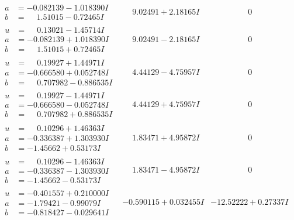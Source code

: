 \documentclass[1p]{elsarticle_modified}
\theoremstyle{definition}
\begin{document}
$$\begin{array}{c|c|c}
\begin{aligned}
a &= -0.082139 - 1.018390 I \\
b &= \phantom{-}1.51015 - 0.72465 I\end{aligned}
 & \phantom{-}9.02491 + 2.18165 I & \phantom{-0.000000 } 0 \\ \hline\begin{aligned}
u &= \phantom{-}0.13021 - 1.45714 I \\
a &= -0.082139 + 1.018390 I \\
b &= \phantom{-}1.51015 + 0.72465 I\end{aligned}
 & \phantom{-}9.02491 - 2.18165 I & \phantom{-0.000000 } 0 \\ \hline\begin{aligned}
u &= \phantom{-}0.19927 + 1.44971 I \\
a &= -0.666580 + 0.052748 I \\
b &= \phantom{-}0.707982 - 0.886535 I\end{aligned}
 & \phantom{-}4.44129 - 4.75957 I & \phantom{-0.000000 } 0 \\ \hline\begin{aligned}
u &= \phantom{-}0.19927 - 1.44971 I \\
a &= -0.666580 - 0.052748 I \\
b &= \phantom{-}0.707982 + 0.886535 I\end{aligned}
 & \phantom{-}4.44129 + 4.75957 I & \phantom{-0.000000 } 0 \\ \hline\begin{aligned}
u &= \phantom{-}0.10296 + 1.46363 I \\
a &= -0.336387 + 1.303930 I \\
b &= -1.45662 + 0.53173 I\end{aligned}
 & \phantom{-}1.83471 + 4.95872 I & \phantom{-0.000000 } 0 \\ \hline\begin{aligned}
u &= \phantom{-}0.10296 - 1.46363 I \\
a &= -0.336387 - 1.303930 I \\
b &= -1.45662 - 0.53173 I\end{aligned}
 & \phantom{-}1.83471 - 4.95872 I & \phantom{-0.000000 } 0 \\ \hline\begin{aligned}
u &= -0.401557 + 0.210000 I \\
a &= -1.79421 - 0.99079 I \\
b &= -0.818427 - 0.029641 I\end{aligned}
 & -0.590115 + 0.032455 I & -12.52222 + 0.27337 I \\ \hline\begin{aligned}

\end{aligned}
\end{array}$$
\end{document}
